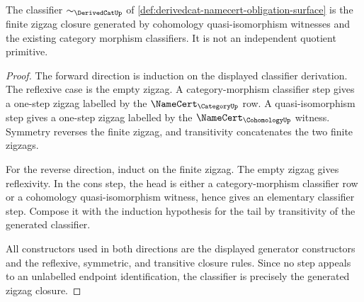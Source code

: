 \begin{theorem}
\label{thm:derivedcat-quasi-isomorphism-classifier-obligation}
The classifier $\sim_{\DerivedCatUp}$ of \autoref{def:derivedcat-namecert-obligation-surface} is the finite zigzag closure generated by cohomology quasi-isomorphism witnesses and the existing category morphism classifiers. It is not an independent quotient primitive.
\end{theorem}
\begin{proof}
The forward direction is induction on the displayed classifier derivation. The reflexive case is the empty zigzag. A category-morphism classifier step gives a one-step zigzag labelled by the $\NameCert_{\CategoryUp}$ row. A quasi-isomorphism step gives a one-step zigzag labelled by the $\NameCert_{\CohomologyUp}$ witness. Symmetry reverses the finite zigzag, and transitivity concatenates the two finite zigzags.

For the reverse direction, induct on the finite zigzag. The empty zigzag gives reflexivity. In the cons step, the head is either a category-morphism classifier row or a cohomology quasi-isomorphism witness, hence gives an elementary classifier step. Compose it with the induction hypothesis for the tail by transitivity of the generated classifier.

All constructors used in both directions are the displayed generator constructors and the reflexive, symmetric, and transitive closure rules. Since no step appeals to an unlabelled endpoint identification, the classifier is precisely the generated zigzag closure.
\end{proof}

